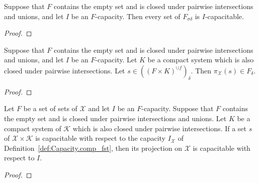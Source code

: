 \begin{lemma}\label{lem:isCapacitable_memDelta_memSigma}
  \leanok
Suppose that $F$ contains the empty set and is closed under pairwise intersections and unions, and let $I$ be an $F$-capacity.
Then every set of $F_{\sigma \delta}$ is $I$-capacitable.
\end{lemma}

\begin{proof}

\end{proof}


\begin{lemma}\label{lem:memDelta_fst}
  \leanok
Suppose that $F$ contains the empty set and is closed under pairwise intersections and unions, and let $I$ be an $F$-capacity.
Let $K$ be a compact system which is also closed under pairwise intersections.
Let $s \in ((F \times K)^{\cup f})_\delta$.
Then $\pi_{\mathcal{X}}(s) \in F_\delta$.
\end{lemma}

\begin{proof}\leanok

\end{proof}


\begin{lemma}\label{lem:IsCapacitable.fst}
  \leanok
Let $F$ be a set of sets of $\mathcal{X}$ and let $I$ be an $F$-capacity.
Suppose that $F$ contains the empty set and is closed under pairwise intersections and unions.
Let $K$ be a compact system of $\mathcal{K}$ which is also closed under pairwise intersections.
If a set $s$ of $\mathcal{X} \times \mathcal{K}$ is capacitable with respect to the capacity $I_{\mathcal{X}}$ of Definition~\ref{def:Capacity.comp_fst}, then its projection on $\mathcal{X}$ is capacitable with respect to $I$.
\end{lemma}

\begin{proof}\leanok

\end{proof}


